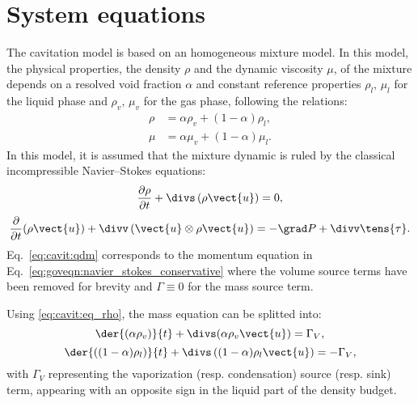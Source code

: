 \section{System equations}

\hypertarget{cavitation}{}

\label{sec:cavit:system_equations}
The cavitation model is based on an homogeneous mixture model. In this
model, the physical properties, the density $\rho$ and the dynamic
viscosity $\mu$, of the mixture depends on a resolved void fraction
$\alpha$ and constant reference properties $\rho_l, \, \mu_l$ for the
liquid phase and $\rho_v, \, \mu_v$ for the gas phase, following the
relations:
\begin{align}
\label{eq:cavit:eq_rho}\rho&= \alpha\rho_v+(1-\alpha)\rho_l, \\
\label{eq:cavit:eq_mu}\mu&= \alpha\mu_v+(1-\alpha)\mu_l.
\end{align}
In this model, it is assumed that the mixture dynamic is ruled by the
classical incompressible Navier--Stokes equations:
\begin{equation}
\label{eq:cavit:mass}
\frac{\partial\rho}{\partial t}+\divs \left(\rho\vect{u} \right) = 0,
\end{equation}
\begin{equation}
\label{eq:cavit:qdm}
\dfrac{\partial }{\partial t}(\rho \vect{u})
+\divv \left( \vect{u}\otimes \rho \vect{u} \right)
= - \grad P + \divv  \tens{\tau}.
\end{equation}
Eq.~\eqref{eq:cavit:qdm} corresponds to the momentum equation in
Eq.~\eqref{eq:goveqn:navier_stokes_conservative} where the volume source
terms have been removed for brevity and $\Gamma\equiv0$ for the mass
source term.

Using \eqref{eq:cavit:eq_rho}, the mass equation can be splitted into:
\begin{equation}
\label{eq:cavit:eq_vf0}
\der{(\alpha\rho_v)}{t}+\divs(\alpha\rho_v\vect{u}) = \Gamma_V,
\end{equation}
\begin{equation}
\label{eq:cavit:eq_lf0}
\der{\left((1-\alpha)\rho_l\right)}{t}+\divs\left((1-\alpha)\rho_l\vect{u}\right) = -\Gamma_V ,
\end{equation}
with $\Gamma_V$ representing the vaporization (resp. condensation) source (resp. sink)
term, appearing with an opposite sign in the liquid part of the
density budget.

